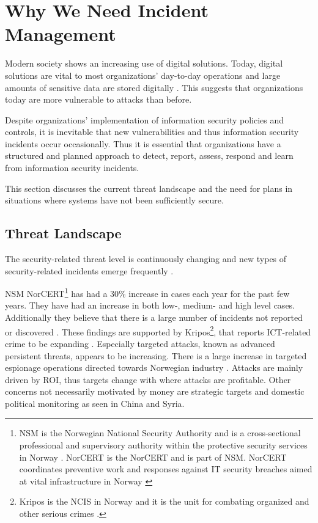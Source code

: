 \section{Why We Need Incident Management}
Modern society shows an increasing use of digital solutions. Today, digital solutions are vital to most organizations' day-to-day operations and large amounts of sensitive data are stored digitally \cite{KriposTrender}. This suggests that organizations today are more vulnerable to attacks than before. 

Despite organizations' implementation of information security policies and controls, it is inevitable that new vulnerabilities and thus information security incidents occur occasionally. Thus it is essential that organizations have a structured and planned approach to detect, report, assess, respond and learn from information security incidents. \cite{ISO/IEC27035}

This section discusses the current threat landscape and the need for plans in situations where systems have not been sufficiently secure. 

\subsection{Threat Landscape}
The security-related threat level is continuously changing and new types of security-related incidents emerge frequently \cite{nist800-61}. %

\acs{NSM} \acs{NorCERT}\footnote{\acs{NSM} is the Norwegian National Security Authority and is a cross-sectional professional and supervisory authority within the protective security services in Norway \cite{AboutNSM}. \acs{NorCERT} is the \acl{NorCERT} and is part of \acs{NSM}. \acs{NorCERT} coordinates preventive work and responses against IT security breaches aimed at vital infrastructure in Norway \cite{AboutNorCERT}} has had a 30\% increase in cases each year for the past few years. They have had an increase in both low-, medium- and high level cases. Additionally they believe that there is a large number of incidents not reported or discovered \cite{NorCERT3Kvartal2012}. These findings are supported by Kripos\footnote{Kripos is the \ac{NCIS} in Norway and it is the unit for combating organized and other serious crimes \cite{policeInNorway}.}, that reports ICT-related crime to be expanding \cite{KriposTrender}. Especially targeted attacks, known as advanced persistent threats, appears to be increasing\cite{Morketall2012}. There is a large increase in targeted espionage operations directed towards Norwegian industry \cite{NSMRapport2012}. Attacks are mainly driven by \ac{ROI}, thus targets change with where attacks are profitable. Other concerns not necessarily motivated by money are strategic targets and domestic political monitoring as seen in China and Syria\cite{Morketall2012}.

